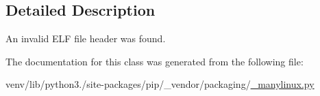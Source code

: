 \subsection{Detailed Description}
\begin{DoxyVerb}An invalid ELF file header was found.
\end{DoxyVerb}
 

The documentation for this class was generated from the following file\+:\begin{DoxyCompactItemize}
\item 
venv/lib/python3./site-\/packages/pip/\+\_\+vendor/packaging/\hyperlink{__manylinux_8py}{\+\_\+manylinux.\+py}\end{DoxyCompactItemize}
